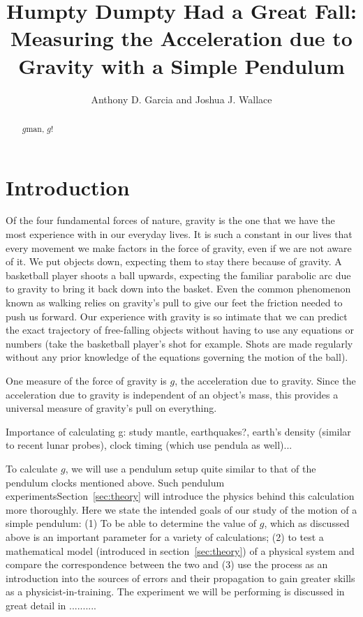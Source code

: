 \documentclass[iop]{emulateapj}
\def\g{$g$}
\begin{document}
\title{Humpty Dumpty Had a Great Fall: Measuring the Acceleration due to Gravity with a Simple Pendulum}

\author{ Anthony D. Garcia
and
Joshua J. Wallace}

\begin{abstract}

\g man, \g!

\end{abstract}

\section{Introduction}

Of the four fundamental forces of nature, gravity is the one that we have the 
most experience with in our everyday lives.  It is such a constant in our lives 
that every movement we make factors in the force of gravity, even if we are not
aware of it. We put objects down, expecting them to stay there because of 
gravity. A basketball player shoots a ball upwards, expecting the familiar 
parabolic arc due to gravity to bring it back down into the basket.  Even the
common phenomenon known as walking relies on gravity's pull to give our feet
the friction needed to push us forward. Our experience with gravity is so
intimate that we can predict the exact trajectory of free-falling objects 
without having to use any equations or numbers (take the basketball player's 
shot for example. Shots are made regularly without any prior knowledge of 
the equations governing the motion of the ball).

One measure of the force of gravity is \g, the acceleration due to gravity. 
Since the acceleration due to gravity is independent of an object's mass, 
this provides a universal measure of gravity's pull on everything.

Importance of calculating g:  study mantle, earthquakes?, earth's density 
(similar to recent lunar probes), clock timing (which use pendula as well)...

To calculate \g, we will use a pendulum setup quite similar to that of the
pendulum clocks mentioned above.  Such pendulum experimentsSection~\ref{sec:theory} will introduce the 
physics behind this calculation more thoroughly.  Here we state the intended 
goals of our study of the motion of a simple pendulum:  (1) To be able to 
determine the value of \g, which as discussed above is an important parameter
for a variety of calculations; (2) to test a mathematical model (introduced in 
section~\ref{sec:theory}) of a physical system and compare the correspondence 
between the two and (3) use the process as an introduction into the sources of 
errors and their propagation to gain greater skills as a physicist-in-training. 
The experiment we will be performing is discussed in great detail in .......... 
\end{document}
